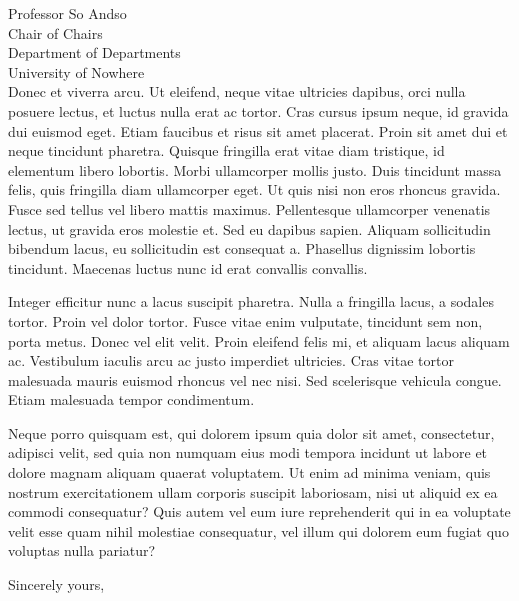 \documentclass[letterpaper]{mscsletter}
\begin{document}
\begin{letter}{
Professor So Andso\\
Chair of Chairs\\
Department of Departments\\
University of Nowhere\\
}
Donec et viverra arcu. Ut eleifend, neque vitae ultricies dapibus,
orci nulla posuere lectus, et luctus nulla erat ac tortor. Cras cursus
ipsum neque, id gravida dui euismod eget. Etiam faucibus et risus sit
amet placerat. Proin sit amet dui et neque tincidunt pharetra. Quisque
fringilla erat vitae diam tristique, id elementum libero
lobortis. Morbi ullamcorper mollis justo. Duis tincidunt massa felis,
quis fringilla diam ullamcorper eget. Ut quis nisi non eros rhoncus
gravida. Fusce sed tellus vel libero mattis maximus. Pellentesque
ullamcorper venenatis lectus, ut gravida eros molestie et. Sed eu
dapibus sapien. Aliquam sollicitudin bibendum lacus, eu sollicitudin
est consequat a. Phasellus dignissim lobortis tincidunt. Maecenas
luctus nunc id erat convallis convallis.

Integer efficitur nunc a lacus suscipit pharetra. Nulla a fringilla
lacus, a sodales tortor. Proin vel dolor tortor. Fusce vitae enim
vulputate, tincidunt sem non, porta metus. Donec vel elit velit. Proin
eleifend felis mi, et aliquam lacus aliquam ac. Vestibulum iaculis
arcu ac justo imperdiet ultricies. Cras vitae tortor malesuada mauris
euismod rhoncus vel nec nisi. Sed scelerisque vehicula congue. Etiam
malesuada tempor condimentum.

Neque porro quisquam est, qui dolorem ipsum quia dolor sit amet,
consectetur, adipisci velit, sed quia non numquam eius modi tempora
incidunt ut labore et dolore magnam aliquam quaerat voluptatem. Ut
enim ad minima veniam, quis nostrum exercitationem ullam corporis
suscipit laboriosam, nisi ut aliquid ex ea commodi consequatur? Quis
autem vel eum iure reprehenderit qui in ea voluptate velit esse quam
nihil molestiae consequatur, vel illum qui dolorem eum fugiat quo
voluptas nulla pariatur?

\closing{Sincerely yours,}

\end{letter}
\end{document}
